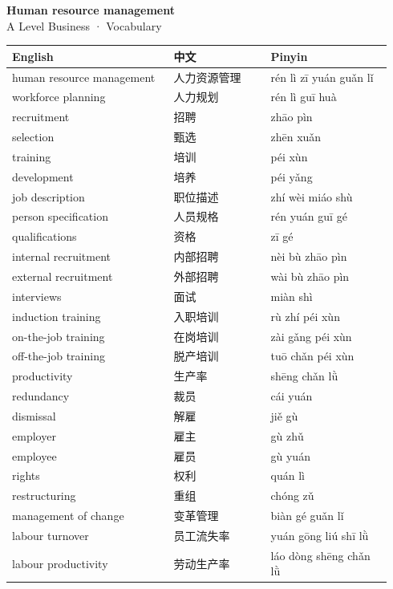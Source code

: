 \documentclass[11pt]{article}
\begin{document}
\begin{center}
  {\LARGE\bfseries Human resource management}\\[0.35em]
  {\large A Level Business · Vocabulary}
\end{center}
\vspace{0.6em}

\begin{longtable}{@{}p{0.40\linewidth}p{0.24\linewidth}p{0.30\linewidth}@{}}
\toprule
\textbf{English} & \textbf{中文} & \textbf{Pinyin} \\
\midrule
\endhead
\bottomrule
\endlastfoot
human resource management & 人力资源管理 & rén lì zī yuán guǎn lǐ \\
workforce planning & 人力规划 & rén lì guī huà \\
recruitment & 招聘 & zhāo pìn \\
selection & 甄选 & zhēn xuǎn \\
training & 培训 & péi xùn \\
development & 培养 & péi yǎng \\
job description & 职位描述 & zhí wèi miáo shù \\
person specification & 人员规格 & rén yuán guī gé \\
qualifications & 资格 & zī gé \\
internal recruitment & 内部招聘 & nèi bù zhāo pìn \\
external recruitment & 外部招聘 & wài bù zhāo pìn \\
interviews & 面试 & miàn shì \\
induction training & 入职培训 & rù zhí péi xùn \\
on-the-job training & 在岗培训 & zài gǎng péi xùn \\
off-the-job training & 脱产培训 & tuō chǎn péi xùn \\
productivity & 生产率 & shēng chǎn lǜ \\
redundancy & 裁员 & cái yuán \\
dismissal & 解雇 & jiě gù \\
employer & 雇主 & gù zhǔ \\
employee & 雇员 & gù yuán \\
rights & 权利 & quán lì \\
restructuring & 重组 & chóng zǔ \\
management of change & 变革管理 & biàn gé guǎn lǐ \\
labour turnover & 员工流失率 & yuán gōng liú shī lǜ \\
labour productivity & 劳动生产率 & láo dòng shēng chǎn lǜ \\

\end{longtable}
\end{document}
